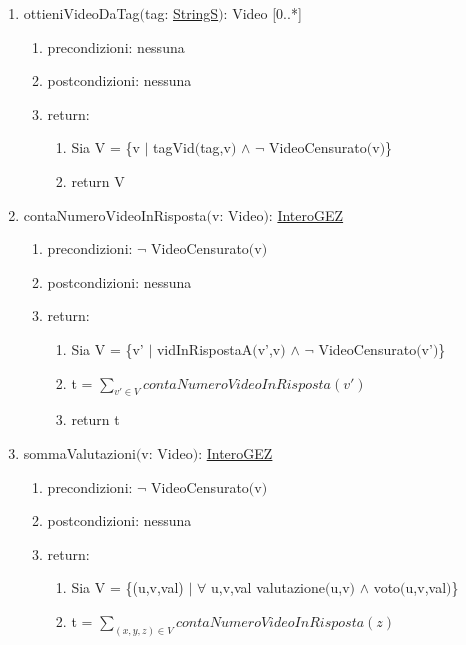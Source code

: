 \documentclass{article}
\begin{document}
\begin{enumerate}
\begin{enumerate}
        \newpage
        \item ottieniVideoDaTag$($tag: \hyperref[sec:TipoStringS]{StringS}$)$: Video [0..*]
        \begin{enumerate}
            \item precondizioni: nessuna
            \item postcondizioni: nessuna
            \item return:
            \begin{enumerate}
                \item Sia V = \{v $|$ tagVid$($tag,v$)$ $\land$ $\neg$ VideoCensurato$($v$)$\}
                \item return V
            \end{enumerate}
        \end{enumerate}
        \newpage
        \item contaNumeroVideoInRisposta$($v: Video$)$: \hyperref[sec:TipoInteroGEZ]{InteroGEZ}
        \begin{enumerate}
            \item precondizioni: $\neg$ VideoCensurato$($v$)$
            \item postcondizioni: nessuna
            \item return:
            \begin{enumerate}
                \item Sia V = \{v' $|$ vidInRispostaA$($v',v$)$ $\land$ $\neg$ VideoCensurato$($v'$)$\}
                \item t = $\sum_{v' \in V} contaNumeroVideoInRisposta(v')$
                \item return t
            \end{enumerate}
        \end{enumerate}
        \newpage
        \item sommaValutazioni$($v: Video$)$: \hyperref[sec:TipoInteroGEZ]{InteroGEZ}
        \begin{enumerate}
            \item precondizioni: $\neg$ VideoCensurato$($v$)$
            \item postcondizioni: nessuna
            \item return:
            \begin{enumerate}
                \item Sia V = \{(u,v,val) $|$ $\forall$ u,v,val valutazione$($u,v$)$ $\land$ voto$($u,v,val$)$\}
                \item t = $\sum_{(x,y,z) \in V} contaNumeroVideoInRisposta(z)$

\end{enumerate}
\end{enumerate}
\end{enumerate}
\end{enumerate}
\end{document}
